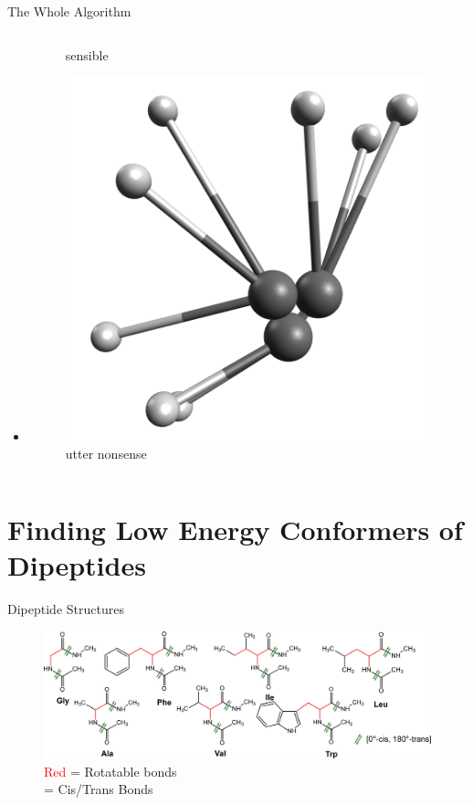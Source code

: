 \documentclass[10pt]{beamer}
\begin{document}
\begin{frame}{The Whole Algorithm}
\begin{columns}[c]
\begin{column}{0.48\textwidth}
\begin{itemize}
{\begin{figure}
						\caption*{sensible}
					\end{figure}
				}
			    \item[]{
			    	\begin{figure}
					    \includegraphics[width=0.7\linewidth]{images/nonsense.png}
					    \caption*{utter nonsense}
					\end{figure}
				}
			\end{itemize}
		\end{column}	
	\end{columns}
\end{frame}

\section{Finding Low Energy Conformers of Dipeptides}

{%
\begin{frame}{Dipeptide Structures}
   	\begin{figure}
   		\includegraphics[width=\linewidth]{images/Supady2.jpeg}
   		\caption*{\textcolor{red}{Red} = Rotatable bonds \\
		   		  \textbf{\textcolor{darkgreen}{\ce{<=>}}} = Cis/Trans Bonds
		   		  }
   	\end{figure}
\end{frame}
}
\end{document}
